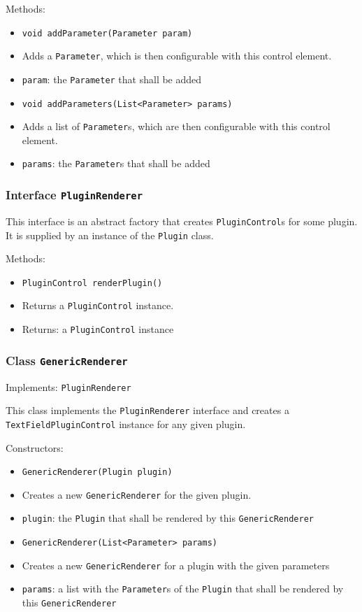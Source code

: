 \documentclass[parskip=full,11pt]{scrartcl}
\begin{document}
Methods:

\begin{itemize}\itemsep -10pt
	\item \texttt{void addParameter(Parameter param)}
	\item[] Adds a \texttt{Parameter}, which is then configurable with this control element.
	\item[] \texttt{param}: the \texttt{Parameter} that shall be added
	\item \texttt{void addParameters(List<Parameter> params)}
	\item[] Adds a list of \texttt{Parameter}s, which are then configurable with this control element.
	\item[] \texttt{params}: the \texttt{Parameter}s that shall be added
\end{itemize}

\subsubsection{Interface \texttt{PluginRenderer}}

This interface is an abstract factory that creates \texttt{PluginControl}s for some plugin. It is supplied by an instance of the \texttt{Plugin} class.

Methods:

\begin{itemize}\itemsep -10pt
	\item \texttt{PluginControl renderPlugin()}
	\item[] Returns a \texttt{PluginControl} instance.
	\item[] Returns: a \texttt{PluginControl} instance
\end{itemize}

\subsubsection{Class \texttt{GenericRenderer}}
Implements: \texttt{PluginRenderer}

This class implements the \texttt{PluginRenderer} interface and creates a \texttt{TextFieldPluginControl} instance for any given plugin.

Constructors:
\begin{itemize}\itemsep -10pt
	\item \texttt{GenericRenderer(Plugin plugin)}
	\item[] Creates a new \texttt{GenericRenderer} for the given plugin.
	\item[] \texttt{plugin}: the \texttt{Plugin} that shall be rendered by this \texttt{GenericRenderer}

	\item \texttt{GenericRenderer(List<Parameter> params)}
	\item[] Creates a new \texttt{GenericRenderer} for a plugin with the given parameters
	\item[] \texttt{params}: a list with the \texttt{Parameter}s of the \texttt{Plugin} that shall be rendered by this \texttt{GenericRenderer}
\end{itemize}
\end{document}
